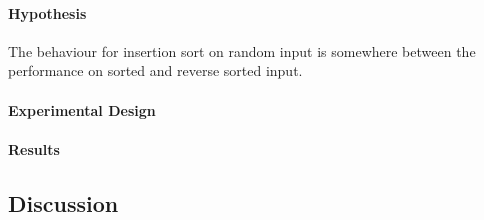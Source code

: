 \documentclass[a4]{article}
\begin{document}
\paragraph{Hypothesis} The behaviour for insertion sort on random input is somewhere between the performance on sorted and reverse sorted input.  


\paragraph{Experimental Design} 








\paragraph{Results} 






\subsection{Discussion}
\end{document}
